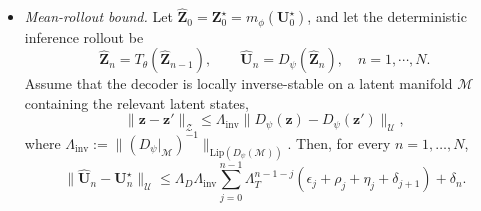 \documentclass[11pt]{article}
\newcommand{\wh}{\widehat}
\begin{document}
\begin{proposition}
\begin{itemize}[topsep=0pt, itemsep=0pt]
\item[(d)]\textit{Mean-rollout bound.}
Let $\wh{\mathbf Z}_0=\mathbf Z_0^\star=m_\phi(\mathbf{U}_0^\star)$, and let the deterministic inference rollout be
\[
\widehat{\mathbf Z}_{n}=T_\theta(\widehat{\mathbf Z}_{n-1}),\qquad\widehat{\mathbf U}_n=D_\psi(\widehat{\mathbf Z}_n),\quad n=1,\cdots,N.
\]
Assume that the decoder is locally inverse-stable on a latent manifold $\mathcal M$ containing the relevant latent states,
\[
\|\mathbf z-\mathbf z'\|_{\mathcal Z}\le\Lambda_{\mathrm{inv}}\|D_\psi(\mathbf z)-D_\psi(\mathbf z')\|_{\mathcal U},
\]
where $\Lambda_{\mathrm{inv}}:=\|(D_\psi|_{\mathcal M})^{-1}\|_{\mathrm{Lip}(D_\psi(\mathcal M))}$. Then, for every $n=1,\ldots,N$,
\[
\|\widehat{\mathbf U}_n-\mathbf U_n^\star\|_{\mathcal U}
\le\Lambda_D\Lambda_{\mathrm{inv}}
\sum_{j=0}^{n-1}\Lambda_T^{n-1-j}
\left(\epsilon_j+\rho_j+\eta_j+\delta_{j+1}\right)+\delta_n .
\]
\end{itemize}
\end{proposition}
\end{document}
